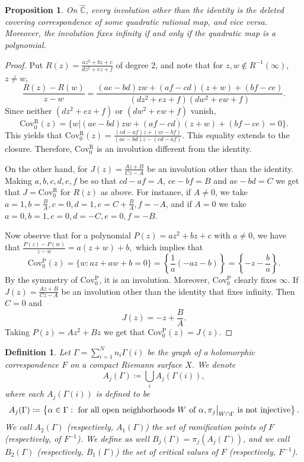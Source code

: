 \documentclass[11pt,letterpaper]{article}
\newtheorem{definition}[theorem]{Definition}
\newtheorem{proposition}[theorem]{Proposition}
\theoremstyle{definition}
\def\covr{\operatorname{Cov^R_0}}
\def\covp{\operatorname{Cov^P_0}}
\newcommand\restr[2]{{%
  \left.\kern-\nulldelimiterspace %
  #1 %
  \vphantom{\big|} %
  \right|_{#2} %
  }}
\def\F{\mathcal{F}_a}
\begin{document}


\begin{proposition}\label{inv} 
On $\widehat{\mathbb{C}}$, every involution other than the identity is the deleted covering correspondence of some quadratic rational map, and vice versa. Moreover, the involution fixes infinity if and only if the quadratic map is a polynomial.
\end{proposition}
\begin{proof}
Put $R(z)=\frac{az^2+bz+c}{dz^2+ez+f}$ of degree $2$, and note that for $z,w\notin R^{-1}(\infty)$, $z\neq w$,
$$\frac{R(z)-R(w)}{z-w}=\frac{(ae-bd)zw+(af-cd)(z+w)+(bf-ce)}{(dz^2+ez+f)(dw^2+ew+f)}.$$
Since neither $(dz^2+ez+f)$ or $(dw^2+ew+f)$ vanish,
$$\covr(z)=\overline{\lbrace w|(ae-bd)zw+(af-cd)(z+w)+(bf-ce)=0\rbrace}.$$
This yields that $\covr(z)=\frac{(cd-af)z+(ce-bf)}{(ae-bd)z-(cd-af)}$. This equality extends to the closure. Therefore, $\covr$ is an involution different from the identity.

On the other hand, for $J(z)=\frac{Az+B}{Cz-A}$ be an involution other than the identity. Making $a,b,c,d,e,f$ be so that $cd-af=A$, $ce-bf=B$ and $ae-bd=C$ we get that $J=\covr$ for $R(z)$ as above.
For instance, if $A\neq 0$, we take $a=1, b=\frac{B}{A},c=0,d=1,e=C+\frac{B}{A},f=-A$, and if $A=0$ we take $a=0, b=1, c=0, d=-C, e=0,f=-B$. 

Now observe that for a polynomial $P(z)=az^2+bz+c$ with $a\neq 0$, we have that $\frac{P(z)-P(w)}{z-w}
=a(z+w)+b,$
which implies that
$$\covp(z)=\lbrace w : az+aw+b=0\rbrace=\left\lbrace\frac{1}{a}(-az-b)\right\rbrace=\left\lbrace -z-\frac{b}{a}\right\rbrace.$$
By the symmetry of $\covp$, it is an involution. Moreover, $\covp$ clearly fixes $\infty$. If $J(z)=\frac{Az+B}{Cz-A}$ be an involution other than the identity that fixes infinity. Then $C=0$ and
$$J(z)=-z+\frac{B}{A}.$$
Taking $P(z)=Az^2+Bz$ we get that $\covp(z)=J(z)$.
\end{proof}


\begin{definition}\label{crit} 
Let $\Gamma=\sum\limits_{i=1}^N n_i\Gamma(i)$ be the graph of a holomorphic correspondence $F$ on a compact Riemann surface $X$. We denote
$$A_j(\Gamma)\coloneqq\bigcup_iA_j(\Gamma(i)),$$
where each $A_j(\Gamma(i))$ is defined to be
$$A_j(\Gamma)\coloneqq\left\lbrace\alpha\in\Gamma:\mbox{ for all open neighborhoods  }W\mbox{ of }\alpha,\restr{\pi_j}{W\cap\Gamma}\mbox{ is not injective}\right\rbrace.$$
We call $A_2(\Gamma)$ (respectively, $A_1(\Gamma)$) the set of \emph{ramification points} of $F$ (respectively, of $F^{-1}$). We define as well $B_j(\Gamma)=\pi_j(A_j(\Gamma))$, and we call $B_2(\Gamma)$ (respectively, $B_1(\Gamma)$) the set of \emph{critical values} of $F$ (respectively, $F^{-1}$).
\end{definition}
\end{document}
